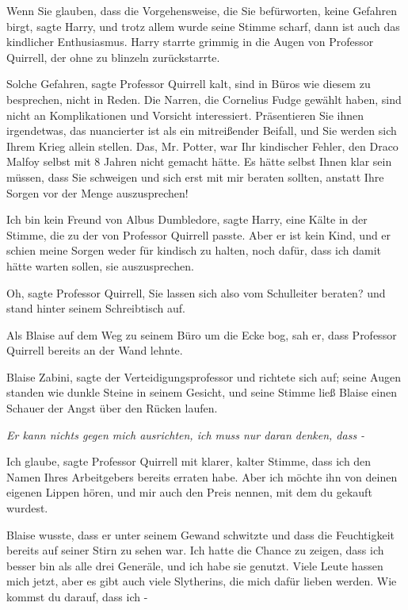 \glqq{}Wenn Sie glauben, dass die Vorgehensweise, die Sie befürworten, keine
Gefahren birgt\grqq{}, sagte Harry, und trotz allem wurde seine Stimme scharf,
\glqq{}dann ist auch das kindlicher Enthusiasmus.\grqq{} Harry starrte grimmig in die
Augen von Professor Quirrell, der ohne zu blinzeln zurückstarrte.

\glqq{}Solche Gefahren\grqq{}, sagte Professor Quirrell kalt, \glqq{}sind in Büros
wie diesem zu besprechen, nicht in Reden. Die Narren, die Cornelius Fudge
gewählt haben, sind nicht an Komplikationen und Vorsicht interessiert.
Präsentieren Sie ihnen irgendetwas, das nuancierter ist als ein mitreißender
Beifall, und Sie werden sich Ihrem Krieg allein stellen. Das, Mr. Potter, war
Ihr kindischer Fehler, den Draco Malfoy selbst mit 8 Jahren nicht gemacht hätte.
Es hätte selbst Ihnen klar sein müssen, dass Sie schweigen und sich erst mit mir
beraten sollten, anstatt Ihre Sorgen vor der Menge auszusprechen!\grqq{}

\glqq{}Ich bin kein Freund von Albus Dumbledore\grqq{}, sagte Harry, eine Kälte
in der Stimme, die zu der von Professor Quirrell passte. \glqq{}Aber er ist kein
Kind, und er schien meine Sorgen weder für kindisch zu halten, noch dafür, dass
ich damit hätte warten sollen, sie auszusprechen.\grqq{}

\glqq{}Oh\grqq{}, sagte Professor Quirrell, \glqq{}Sie lassen sich also vom
Schulleiter beraten?\grqq{} und stand hinter seinem Schreibtisch auf.

Als Blaise auf dem Weg zu seinem Büro um die Ecke bog, sah er, dass Professor
Quirrell bereits an der Wand lehnte.

\glqq{}Blaise Zabini\grqq{}, sagte der Verteidigungsprofessor und richtete sich
auf; seine Augen standen wie dunkle Steine in seinem Gesicht, und seine Stimme
ließ Blaise einen Schauer der Angst über den Rücken laufen.

\emph{Er kann nichts gegen mich ausrichten, ich muss nur daran denken, dass -}

\glqq{}Ich glaube\grqq{}, sagte Professor Quirrell mit klarer, kalter Stimme,
\glqq{}dass ich den Namen Ihres Arbeitgebers bereits erraten habe. Aber ich
möchte ihn von deinen eigenen Lippen hören, und mir auch den Preis nennen, mit
dem du gekauft wurdest.\grqq{}

Blaise wusste, dass er unter seinem Gewand schwitzte und dass die Feuchtigkeit
bereits auf seiner Stirn zu sehen war. \glqq{}Ich hatte die Chance zu zeigen,
dass ich besser bin als alle drei Generäle, und ich habe sie genutzt. Viele
Leute hassen mich jetzt, aber es gibt auch viele Slytherins, die mich dafür
lieben werden. Wie kommst du darauf, dass ich -\grqq{}

